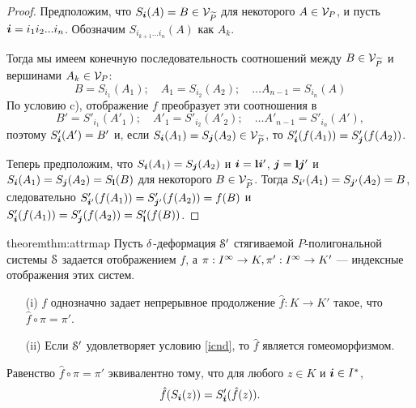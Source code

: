 \begin{proof}
Предположим, что $S_{\bm{i}}(A)=B\in {\mathcal V}_{\widetilde P}$ для некоторого $A\in {\mathcal V}_P$, и пусть ${\bm{i}}=i_1i_2...i_n$. 
Обозначим $S_{i_{k+1}...i_n}(A)$ как $A_k$.

Тогда мы имеем конечную последовательность соотношений между $B\in {\mathcal V}_{\widetilde P}$ и вершинами $A_k\in{\mathcal V}_P$:\\
\begin{equation}\label{chn1}
B=S_{i_1}(A_1); \quad A_1=S_{i_2}(A_2); \quad \ldots A_{n-1}=S_{i_n}(A)
\end{equation}
По условию c),  отображение $f$ преобразует  эти соотношения  в  
\begin{equation}\label{chn2} 
B'=S'_{i_1}(A'_1); \quad A'_1=S'_{i_2}(A'_2); \quad \ldots  A'_{n-1}=S'_{i_n}(A'), 
\end{equation}
поэтому $S'_{\bm{i}}(A')=B'$ и, если $S_{\bm{i}}(A_1)=S_{\bm{j}}(A_2)\in {\mathcal V}_{{\widetilde P}}$, то $S'_{\bm{i}}(f(A_1))=S'_{\bm{j}}(f(A_2))$.

Теперь предположим,  что $S_{\bm{i}}(A_1)=S_{\bm{j}}(A_2)$ и ${\bm{i}}={\bf{l}}{\bm{i}}'$, ${\bm{j}}={\bf{l}}{\bm{j}}'$ и $S_{\bm{i}}(A_1)=S_{\bm{j}}(A_2)=S_{\bf{l}}(B)$ для некоторого $B\in {\mathcal V}_{\widetilde P}$. 
Тогда  $S_{{\bm{i}}'}(A_1)=S_{{\bm{j}}'}(A_2)=B$, следовательно $S'_{{\bm{i}}'}(f(A_1))=S'_{{\bm{j}}'}(f(A_2))=f(B)$ и
$S'_{{\bm{i}}}(f(A_1))=S'_{{\bm{j}}}(f(A_2))=S'_{\bf{l}}(f(B))$.
\end{proof}

\begin{restatethis}{theorem}{thm:attrmap}\label{thm:attrmap}
Пусть  $\delta$-деформация ${\EuScript S}'$ стягиваемой $P$-полигональной системы ${\EuScript S}$ задается отображением $f$, а $\pi:I^\infty\to K, \pi':I^\infty\to K'$ --- индексные отображения этих систем.
\begin{itemize}[nolistsep]
    \item[(i)] $f$ однозначно задает непрерывное продолжение $\hat f:K\to K'$ такое, что $\hat f\circ\pi=\pi'$.
    \item[(ii)] Если ${\EuScript S}'$ удовлетворяет условию \eqref{icnd}, то $\hat f$ является гомеоморфизмом.
\end{itemize}    
\end{restatethis}

\begin{remark}
Равенство  $\hat f\circ\pi=\pi'$ эквивалентно тому, что для любого $z\in K$ и ${\bm{i}}\in I^*$,
\begin{equation}\label{compat}
\hat f(S_{\bm{i}}(z))=S'_{\bm{i}}(\hat f(z)).
\end{equation}
\end{remark}

